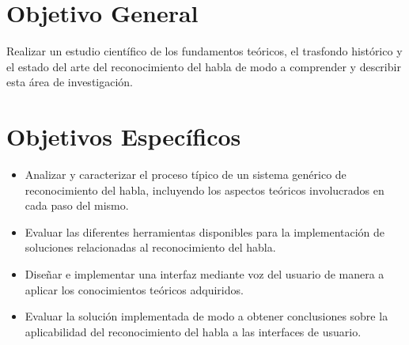 \section{Objetivo General}
\label{sec:objgral}

Realizar un estudio cient\'{i}fico de los fundamentos te\'{o}ricos, el trasfondo hist\'{o}rico 
y el estado del arte del reconocimiento del habla de modo a comprender y describir esta 
\'{a}rea de investigaci\'{o}n.  


\section{Objetivos Espec\'{i}ficos}
\label{sec:objspec}

\begin{itemize}
    \item Analizar y caracterizar el proceso t\'{i}pico de un sistema gen\'{e}rico de reconocimiento
    del habla, incluyendo los aspectos te\'{o}ricos involucrados en cada paso del mismo.
    
    \item Evaluar las diferentes herramientas disponibles para la implementaci\'{o}n 
    de soluciones relacionadas al reconocimiento del habla.
    
    \item Dise\~{n}ar e implementar una interfaz mediante voz del usuario de manera a aplicar los 
    conocimientos te\'{o}ricos adquiridos.
    
    \item Evaluar la soluci\'{o}n implementada de modo a obtener conclusiones sobre la aplicabilidad 
    del reconocimiento del habla a las interfaces de usuario. 
\end{itemize}
